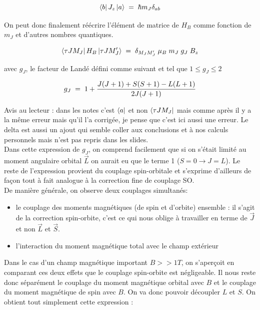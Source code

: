 \begin{equation*}
    \bra{b}J_z\ket{a} \; = \; \hbar m_J \delta_{ab}
\end{equation*}

On peut donc finalement réécrire l'élément de matrice de $H_B$ comme fonction de $m_J$ et d'autres nombres quantiques.

\begin{equation*}
    \bra{\tau J M_J}H_B\ket{\tau J M'_J} \; = \; \delta_{M_J M'_J} \;\mu_B \; m_J \; g_J \; B_z
\end{equation*}

avec $g_J$, le facteur de Landé défini comme suivant et tel que $1\leq g_J \leq 2$

\begin{equation*}
    g_J \; = \;  1 + \dfrac{J(J+1) + S(S+1) - L(L+1)}{2J(J+1)}
\end{equation*}

Avis au lecteur : dans les notes c'est $\bra{a}$ et non $\bra{\tau J M_J}$ mais comme après il y a la même erreur mais qu'il l'a corrigée, je pense que c'est ici aussi une erreur. Le delta est aussi un ajout qui semble coller aux conclusions et à nos calculs personnels mais n'est pas repris dans les slides.\\

Dans cette expression de $g_J$, on comprend facilement que si on s'était limité au moment angulaire orbital $\vec{L}$ on aurait eu que le terme 1 ($S=0 \rightarrow J=L$). Le reste de l'expression provient du couplage spin-orbitale et s'exprime d'ailleurs de façon tout à fait analogue à la correction fine de couplage SO.\\

De manière générale, on observe deux couplages simultanés:
\begin{itemize}[label=$\bullet$]
    \item le couplage des moments magnétiques (de spin et d'orbite) ensemble : il s'agit de la correction spin-orbite, c'est ce qui nous oblige à travailler en terme de $\vec{J}$ et non $\vec{L}$ et $\vec{S}$.
    \item l'interaction du moment magnétique total avec le champ extérieur
\end{itemize}
Dans le cas d'un champ magnétique important $B>>1T$, on s'aperçoit en comparant ces deux effets que le couplage spin-orbite est négligeable. Il nous reste donc séparément le couplage du moment magnétique orbital avec $B$ et le couplage du moment magnétique de spin avec $B$. On va donc pouvoir découpler $L$ et $S$. On obtient tout simplement cette expression :

